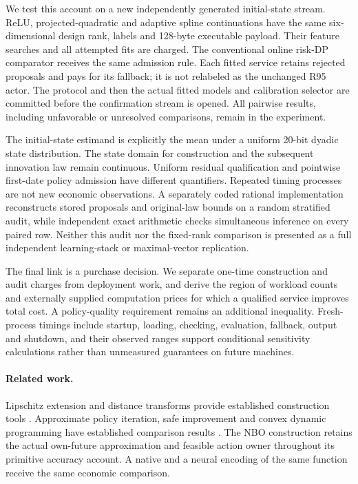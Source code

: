 We test this account on a new independently generated initial-state stream. ReLU, projected-quadratic and adaptive spline continuations have the same six-dimensional design rank, labels and 128-byte executable payload. Their feature searches and all attempted fits are charged. The conventional online risk-DP comparator receives the same admission rule. Each fitted service retains rejected proposals and pays for its fallback; it is not relabeled as the unchanged R95 actor. The protocol and then the actual fitted models and calibration selector are committed before the confirmation stream is opened. All pairwise results, including unfavorable or unresolved comparisons, remain in the experiment.

The initial-state estimand is explicitly the mean under a uniform 20-bit dyadic state distribution. The state domain for construction and the subsequent innovation law remain continuous. Uniform residual qualification and pointwise first-date policy admission have different quantifiers. Repeated timing processes are not new economic observations. A separately coded rational implementation reconstructs stored proposals and original-law bounds on a random stratified audit, while independent exact arithmetic checks simultaneous inference on every paired row. Neither this audit nor the fixed-rank comparison is presented as a full independent learning-stack or maximal-vector replication.

The final link is a purchase decision. We separate one-time construction and audit charges from deployment work, and derive the region of workload counts and externally supplied computation prices for which a qualified service improves total cost. A policy-quality requirement remains an additional inequality. Fresh-process timings include startup, loading, checking, evaluation, fallback, output and shutdown, and their observed ranges support conditional sensitivity calculations rather than unmeasured guarantees on future machines.

\paragraph{Related work.}
Lipschitz extension and distance transforms provide established construction tools \citep{mcshane1934,felzenszwalb2012}. Approximate policy iteration, safe improvement and convex dynamic programming have established comparison results \citep{munos2003,pirotta2013,scherrer2015,yang2020convex}. The NBO construction retains the actual own-future approximation and feasible action owner throughout its primitive accuracy account. A native and a neural encoding of the same function receive the same economic comparison.

